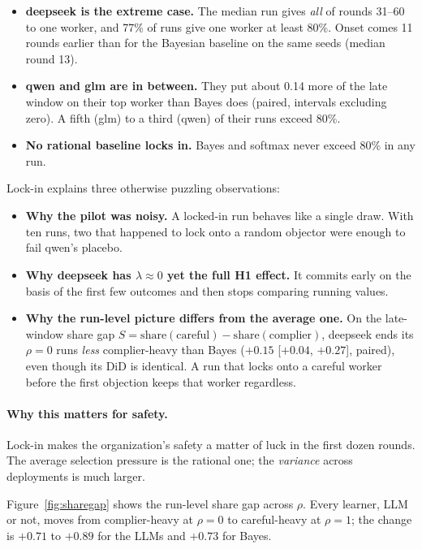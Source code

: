 \documentclass[11pt,a4paper]{article}
\newcommand{\did}{\mathrm{DiD}}
\begin{document}
\begin{itemize}
  \item \textbf{deepseek is the extreme case.} The median run gives \emph{all} of rounds 31--60 to one worker, and 77\% of runs give one worker at least 80\%. Onset comes 11 rounds earlier than for the Bayesian baseline on the same seeds (median round 13).
  \item \textbf{qwen and glm are in between.} They put about 0.14 more of the late window on their top worker than Bayes does (paired, intervals excluding zero). A fifth (glm) to a third (qwen) of their runs exceed 80\%.
  \item \textbf{No rational baseline locks in.} Bayes and softmax never exceed 80\% in any run.
\end{itemize}

Lock-in explains three otherwise puzzling observations:
\begin{itemize}
  \item \textbf{Why the pilot was noisy.} A locked-in run behaves like a single draw. With ten runs, two that happened to lock onto a random objector were enough to fail qwen's placebo.
  \item \textbf{Why deepseek has $\hat\lambda\approx0$ yet the full H1 effect.} It commits early on the basis of the first few outcomes and then stops comparing running values.
  \item \textbf{Why the run-level picture differs from the average one.} On the late-window share gap $S=\text{share}(\text{careful})-\text{share}(\text{complier})$, deepseek ends its $\rho=0$ runs \emph{less} complier-heavy than Bayes ($+0.15$ [$+0.04$, $+0.27$], paired), even though its $\did$ is identical. A run that locks onto a careful worker before the first objection keeps that worker regardless.
\end{itemize}

\paragraph{Why this matters for safety.} Lock-in makes the organization's safety a matter of luck in the first dozen rounds. The average selection pressure is the rational one; the \emph{variance} across deployments is much larger.

Figure~\ref{fig:sharegap} shows the run-level share gap across $\rho$. Every learner, LLM or not, moves from complier-heavy at $\rho=0$ to careful-heavy at $\rho=1$; the change is $+0.71$ to $+0.89$ for the LLMs and $+0.73$ for Bayes.
\end{document}
